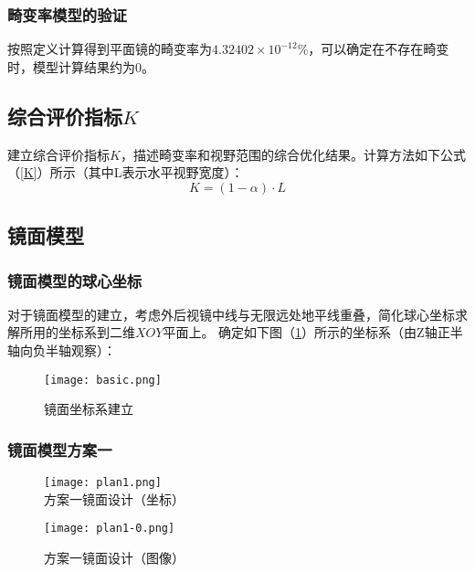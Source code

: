 \documentclass[withoutpreface,bwprint]{cumcmthesis} %
\begin{document}
\subsubsection{畸变率模型的验证}

\par 按照定义计算得到平面镜的畸变率为$4.32402\times 10^{-12}\%$，可以确定在不存在畸变时，模型计算结果约为0。


\subsection{综合评价指标$K$}
\par 建立综合评价指标$K$，描述畸变率和视野范围的综合优化结果。计算方法如下公式（\ref{K}）所示（其中L表示水平视野宽度）：
\begin{equation}
\label{K}
	K = (1 - \alpha) \cdot L
\end{equation}

\subsection{镜面模型}
\subsubsection{镜面模型的球心坐标}

\par 对于镜面模型的建立，考虑外后视镜中线与无限远处地平线重叠，简化球心坐标求解所用的坐标系到二维$XOY$平面上。 确定如下图（\ref{basic}）所示的坐标系（由Z轴正半轴向负半轴观察）：

\begin{figure}[!htb]
\centering
\texttt{[image: basic.png]}
\caption{镜面坐标系建立}
\label{basic}
\end{figure}


\subsubsection{镜面模型方案一}

\begin{figure}[!htbp]  
\begin{minipage}[t]{0.5\textwidth}
\centering  
\texttt{[image: plan1.png]} \\
\caption{方案一镜面设计（坐标）} \label{plan1}
\end{minipage}
\hspace{1ex}
\begin{minipage}[t]{0.5\textwidth}  
\centering  
\texttt{[image: plan1-0.png]}\\
\caption{方案一镜面设计（图像）}  \label{plan1-0}
\end{minipage}  
\end{figure} 
\end{document}
